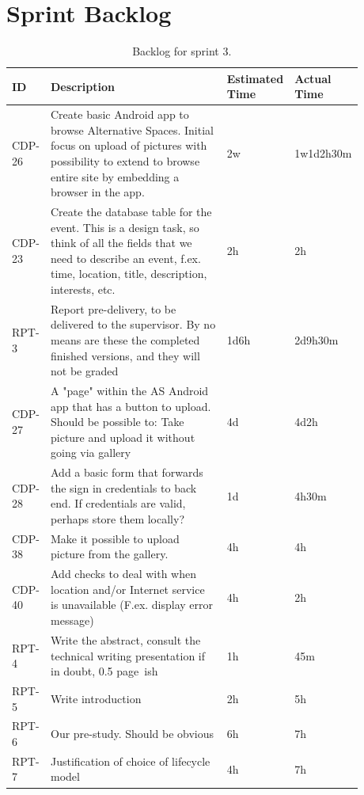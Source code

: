 \section{Sprint Backlog}
\label{sec:S4Backlog}

\begin{landscape}
\setlength{\tabcolsep}{10pt}
\begin{table}[htbp]
\centering
{}
\begin{tabular}{|p{0.08\linewidth}|p{0.6\linewidth}|p{0.1\linewidth}|p{0.1\linewidth}|}
\hline
\cellcolor{gray!25} ID & \cellcolor{gray!25} Description & \cellcolor{gray!25} Estimated Time & \cellcolor{gray!25} Actual Time \\
\hline
CDP-26 & Create basic Android app to browse Alternative Spaces. Initial focus on upload of pictures with possibility to extend to browse entire site by embedding a browser in the app. & 2w & 1w1d2h30m \\
CDP-23 & Create the database table for the event. This is a design task, so think of all the fields that we need to describe an event, f.ex. time, location, title, description, interests, etc. & 2h & 2h \\ 
RPT-3  & Report pre-delivery, to be delivered to the supervisor. By no means are these the completed finished versions, and they will not be graded  & 1d6h & 2d9h30m \\
CDP-27 & A "page" within the AS Android app that has a button to upload. Should be possible to: Take picture and upload it without going via gallery & 4d & 4d2h \\
CDP-28 & Add a basic form that forwards the sign in credentials to back end. If credentials are valid, perhaps store them locally? & 1d & 4h30m \\
CDP-38 & Make it possible to upload picture from the gallery. & 4h & 4h \\
CDP-40 & Add checks to deal with when location and/or Internet service is unavailable (F.ex. display error message) & 4h & 2h \\
RPT-4 & Write the abstract, consult the technical writing presentation if in doubt, 0.5 page~ish & 1h & 45m \\
RPT-5 & Write introduction & 2h & 5h \\
RPT-6 & Our pre-study. Should be obvious & 6h & 7h \\
RPT-7 & Justification of choice of lifecycle model & 4h & 7h \\
\hline
\end{tabular}
\caption{Backlog for sprint 3.}
\label{tab:S4Backlog}
\end{table}
\end{landscape}

